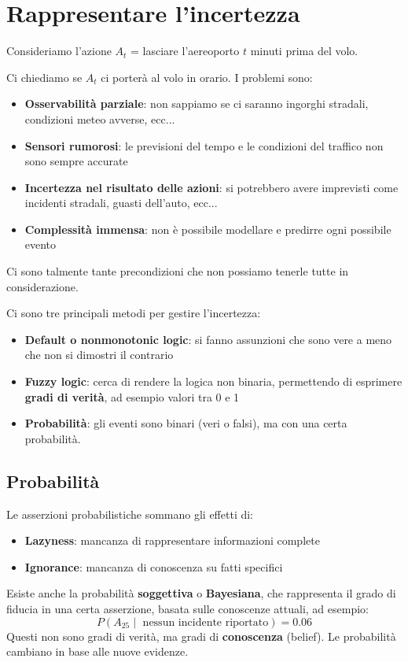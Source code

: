 \documentclass[a4paper]{article}
\begin{document}
\section{Rappresentare l'incertezza}
\begin{example}
  Consideriamo l'azione \( A_t \) = lasciare l'aereoporto \( t \) minuti prima
  del volo.

  \vspace{1em}
  \noindent
  Ci chiediamo se \( A_t \) ci porterà al volo in orario. I problemi sono:
  \begin{itemize}
    \item \textbf{Osservabilità parziale}: non sappiamo se ci saranno ingorghi
      stradali, condizioni meteo avverse, ecc...
    \item \textbf{Sensori rumorosi}: le previsioni del tempo e le condizioni del traffico
      non sono sempre accurate
    \item \textbf{Incertezza nel risultato delle azioni}: si potrebbero avere imprevisti
      come incidenti stradali, guasti dell'auto, ecc...
    \item \textbf{Complessità immensa}: non è possibile modellare e predirre 
      ogni possibile evento
  \end{itemize}
  Ci sono talmente tante precondizioni che non possiamo tenerle tutte in considerazione.
\end{example}
Ci sono tre principali metodi per gestire l'incertezza:
\begin{itemize}
  \item \textbf{Default o nonmonotonic logic}: si fanno assunzioni che sono vere a meno
    che non si dimostri il contrario

  \item \textbf{Fuzzy logic}: cerca di rendere la logica non binaria, permettendo
    di esprimere \textbf{gradi di verità}, ad esempio valori tra 0 e 1

  \item \textbf{Probabilità}: gli eventi sono binari (veri o falsi), ma con una
    certa probabilità.
\end{itemize}

\subsection{Probabilità}
Le asserzioni probabilistiche sommano gli effetti di:
\begin{itemize}
  \item \textbf{Lazyness}: mancanza di rappresentare informazioni complete
  \item \textbf{Ignorance}: mancanza di conoscenza su fatti specifici
\end{itemize}
Esiste anche la probabilità \textbf{soggettiva} o \textbf{Bayesiana}, che
rappresenta il grado di fiducia in una certa asserzione, basata sulle
conoscenze attuali, ad esempio:
\[
  P(A_25 \;|\; \text{ nessun incidente riportato}) = 0.06
\] 
Questi non sono gradi di verità, ma gradi di \textbf{conoscenza} (belief). Le probabilità
cambiano in base alle nuove evidenze.
\end{document}
